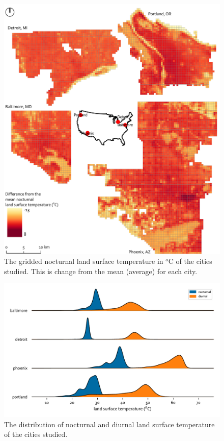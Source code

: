 \documentclass[final,3p,times,twocolumn,sort&compress]{elsarticle}
\begin{document}
\begin{figure}
    \centering
    \includegraphics[width=\textwidth]{fig/report/map_nocturnal_lst.pdf}
    \caption{The gridded nocturnal land surface temperature in $^o$C of the cities studied. This is change from the mean (average) for each city.}
    \label{fig:map}
\end{figure}


\begin{figure}
    \centering
    \includegraphics[width=\linewidth]{fig/report/joyplot_lst_500.pdf}
    \caption{The distribution of nocturnal and diurnal land surface temperature of the cities studied.}
    \label{fig:joy}
\end{figure}
\end{document}
